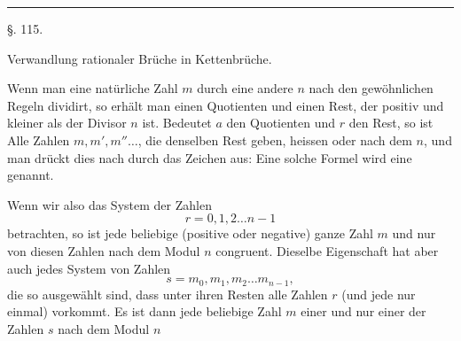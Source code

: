 
\begin{center}
\end{center}

\begin{center}
\end{center}

\begin{center}
\rule{3cm}{0.4pt}
\end{center}

\begin{center}
§. 115.
\end{center}

\begin{center}
Verwandlung rationaler Brüche in Kettenbrüche.
\end{center}

Wenn man eine natürliche Zahl $m$ durch eine andere $n$ nach den gewöhnlichen Regeln dividirt, so erhält man einen Quotienten und einen Rest, der positiv und kleiner als der Divisor $n$ ist. Bedeutet $a$ den Quotienten und $r$ den Rest, so ist
Alle Zahlen $m, m', m''\ldots$, die denselben Rest geben, heissen  oder  nach dem  $n$, und man drückt dies nach  durch das Zeichen aus:
Eine solche Formel wird eine  genannt.

Wenn wir also das System der Zahlen
\[
r = 0, 1, 2 \ldots n - 1
\]
betrachten, so ist jede beliebige (positive oder negative) ganze Zahl $m$  und nur  von diesen Zahlen nach dem Modul $n$ congruent. Dieselbe Eigenschaft hat aber auch jedes System von Zahlen
\[
s = m_0, m_1, m_2 \ldots m_{n-1},
\]
die so ausgewählt sind, dass unter ihren Resten alle Zahlen $r$ (und jede nur einmal) vorkommt. Es ist dann jede beliebige Zahl $m$ einer und nur einer der Zahlen $s$ nach dem Modul $n$

